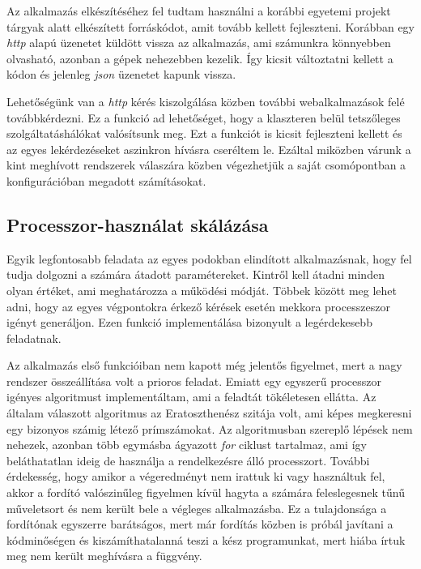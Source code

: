Az alkalmazás elkészítéséhez fel tudtam használni a korábbi egyetemi projekt tárgyak alatt elkészített forráskódot, amit tovább kellett fejleszteni. Korábban egy \textit{http} alapú üzenetet küldött vissza az alkalmazás, ami számunkra könnyebben olvasható, azonban a gépek nehezebben kezelik. Így kicsit változtatni kellett a kódon és jelenleg \textit{json} üzenetet kapunk vissza.

Lehetőségünk van a \textit{http} kérés kiszolgálása közben további webalkalmazások felé továbbkérdezni. Ez a funkció ad lehetőséget, hogy a klaszteren belül tetszőleges szolgáltatáshálókat valósítsunk meg. Ezt a funkciót is kicsit fejleszteni kellett és az egyes lekérdezéseket aszinkron hívásra cseréltem le. Ezáltal miközben várunk a kint meghívott rendszerek válaszára közben végezhetjük a saját csomópontban a konfigurációban megadott számításokat. 

\subsection{Processzor-használat skálázása}
Egyik legfontosabb feladata az egyes podokban elindított alkalmazásnak, hogy fel tudja dolgozni a számára átadott paramétereket.
Kintről kell átadni minden olyan értéket, ami meghatározza a működési módját.
Többek között meg lehet adni, hogy az egyes végpontokra érkező kérések esetén mekkora processzeszor igényt generáljon.
Ezen funkció implementálása bizonyult a legérdekesebb feladatnak.

Az alkalmazás első funkcióiban nem kapott még jelentős figyelmet, mert a nagy rendszer összeállítása volt a prioros feladat.
Emiatt egy egyszerű processzor igényes algoritmust implementáltam, ami a feladtát tökéletesen ellátta.
Az általam válaszott algoritmus az Eratoszthenész szitája volt, ami képes megkeresni egy bizonyos számig létező prímszámokat.
Az algoritmusban szereplő lépések nem nehezek, azonban több egymásba ágyazott \textit{for} ciklust tartalmaz, ami így beláthatatlan ideig de használja a rendelkezésre álló processzort.
További érdekesség, hogy amikor a végeredményt nem irattuk ki vagy használtuk fel, akkor a fordító valószinűleg figyelmen kívül hagyta a számára feleslegesnek tűnű műveletsort és nem került bele a végleges alkalmazásba.
Ez a tulajdonsága a fordítónak egyszerre barátságos, mert már fordítás közben is próbál javítani a kódminőségen és kiszámíthatalanná teszi a kész programunkat, mert hiába írtuk meg nem került meghívásra a függvény.

